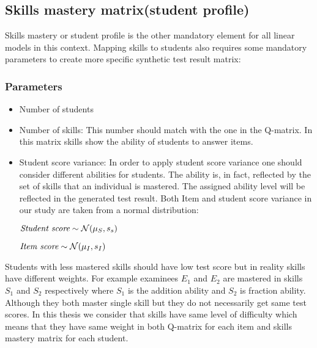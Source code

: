 \subsection{Skills mastery matrix(student profile)}
\label{Student_Profile}
Skills mastery or student profile is the other mandatory element for all linear models in this context. Mapping skills to students also requires some mandatory parameters to create more specific synthetic test result matrix:
\subsubsection{Parameters}
\begin{itemize}
\item Number of students 
\item Number of skills: This number should match with the one in the Q-matrix. In this matrix skills show the ability of students to answer items.
\item Student score variance:  In order to apply student score variance one should consider different abilities for students. The ability is, in fact, reflected by the set of skills that an individual is mastered. The assigned ability level will be reflected in the generated test result. Both Item and student score variance in our study are taken from a normal distribution:

\begin{center}
$\textit{Student score} \sim \mathcal{N}(\mu_S, s_s)$

$\textit{Item score} \sim \mathcal{N}(\mu_I, s_I)$
\end{center}

\end{itemize}


Students with less mastered skills should have low test score but in reality skills have different weights. For example examinees $E_1$ and $E_2$ are mastered in skills $S_1$ and $S_2$ respectively where $S_1$ is the addition ability and $S_2$ is fraction ability. Although they both master single skill but they do not necessarily get same test scores. In this thesis we consider that skills have same level of difficulty which means that they have same weight in both Q-matrix for each item and skills mastery matrix for each student. 



